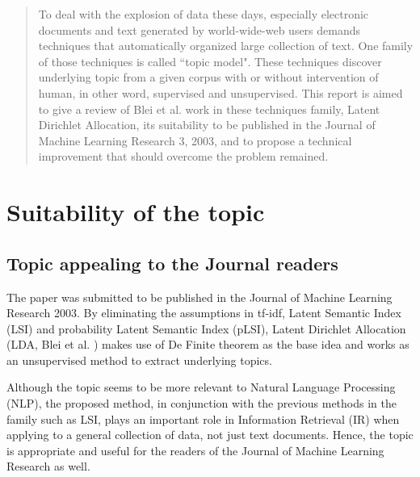 \documentclass[conference,compsoc]{IEEEtran}
\begin{document}
	
	
	
	\maketitle
	
	\begin{abstract}
		To deal with the explosion of data these days, especially electronic documents and text generated by world-wide-web users demands techniques that automatically organized large collection of text. One family of those techniques is called ``topic model". These techniques discover underlying topic from a given corpus with or without intervention of human, in other word, supervised and unsupervised. This report is aimed to give a review of Blei et al. work in these techniques family, Latent Dirichlet Allocation, its suitability to be published in the Journal of Machine Learning Research 3, 2003, and to propose a technical improvement that should overcome the problem remained.
	\end{abstract}
	
	
	\section{Suitability of the topic}
	\subsection{Topic appealing to the Journal readers}
	The paper was submitted to be published in the Journal of Machine Learning Research 2003. 
	By eliminating the assumptions in tf-idf, Latent Semantic Index (LSI) and probability Latent Semantic Index (pLSI), Latent Dirichlet Allocation (LDA, Blei et al. \cite{Blei2003}) makes use of De Finite theorem as the base idea and works as an unsupervised method to extract underlying topics.
	
	Although the topic seems to be more relevant to Natural Language Processing (NLP), the proposed method, in conjunction with the previous methods in the family such as LSI, plays an important role in Information Retrieval (IR) when applying to a general collection of data, not just text documents. Hence, the topic is appropriate and useful for the readers of the Journal of Machine Learning Research as well.
\end{document}
